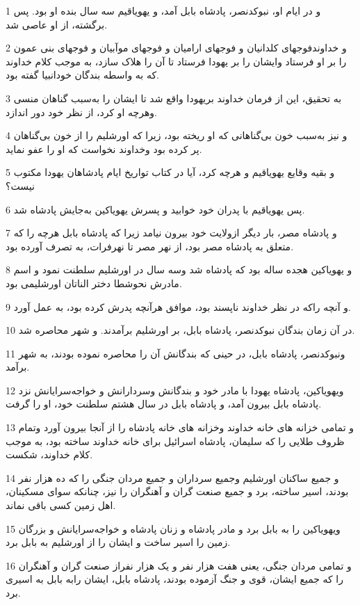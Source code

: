 \par 1 و در ایام او، نبوکدنصر، پادشاه بابل آمد، و یهویاقیم سه سال بنده او بود. پس برگشته، از او عاصی شد.
\par 2 و خداوندفوجهای کلدانیان و فوجهای ارامیان و فوجهای موآبیان و فوجهای بنی عمون را بر او فرستاد وایشان را بر یهودا فرستاد تا آن را هلاک سازد، به موجب کلام خداوند که به واسطه بندگان خودانبیا گفته بود.
\par 3 به تحقیق، این از فرمان خداوند بریهودا واقع شد تا ایشان را به‌سبب گناهان منسی وهرچه او کرد، از نظر خود دور اندازد.
\par 4 و نیز به‌سبب خون بی‌گناهانی که او ریخته بود، زیرا که اورشلیم را از خون بی‌گناهان پر کرده بود وخداوند نخواست که او را عفو نماید.
\par 5 و بقیه وقایع یهویاقیم و هرچه کرد، آیا در کتاب تواریخ ایام پادشاهان یهودا مکتوب نیست؟
\par 6 پس یهویاقیم با پدران خود خوابید و پسرش یهویاکین به‌جایش پادشاه شد.
\par 7 و پادشاه مصر، بار دیگر ازولایت خود بیرون نیامد زیرا که پادشاه بابل هرچه را که متعلق به پادشاه مصر بود، از نهر مصر تا نهرفرات، به تصرف آورده بود.
\par 8 و یهویاکین هجده ساله بود که پادشاه شد وسه سال در اورشلیم سلطنت نمود و اسم مادرش نحوشطا دختر الناتان اورشلیمی بود.
\par 9 و آنچه راکه در نظر خداوند ناپسند بود، موافق هرآنچه پدرش کرده بود، به عمل آورد.
\par 10 در آن زمان بندگان نبوکدنصر، پادشاه بابل، بر اورشلیم برآمدند. و شهر محاصره شد.
\par 11 ونبوکدنصر، پادشاه بابل، در حینی که بندگانش آن را محاصره نموده بودند، به شهر برآمد.
\par 12 ویهویاکین، پادشاه یهودا با مادر خود و بندگانش وسردارانش و خواجه‌سرایانش نزد پادشاه بابل بیرون آمد، و پادشاه بابل در سال هشتم سلطنت خود، او را گرفت.
\par 13 و تمامی خزانه های خانه خداوند وخزانه های خانه پادشاه را از آنجا بیرون آورد وتمام ظروف طلایی را که سلیمان، پادشاه اسرائیل برای خانه خداوند ساخته بود، به موجب کلام خداوند، شکست.
\par 14 و جمیع ساکنان اورشلیم وجمیع سرداران و جمیع مردان جنگی را که ده هزار نفر بودند، اسیر ساخته، برد و جمیع صنعت گران و آهنگران را نیز، چنانکه سوای مسکینان، اهل زمین کسی باقی نماند.
\par 15 ویهویاکین را به بابل برد و مادر پادشاه و زنان پادشاه و خواجه‌سرایانش و بزرگان زمین را اسیر ساخت و ایشان را از اورشلیم به بابل برد.
\par 16 و تمامی مردان جنگی، یعنی هفت هزار نفر و یک هزار نفراز صنعت گران و آهنگران را که جمیع ایشان، قوی و جنگ آزموده بودند، پادشاه بابل، ایشان رابه بابل به اسیری برد.
